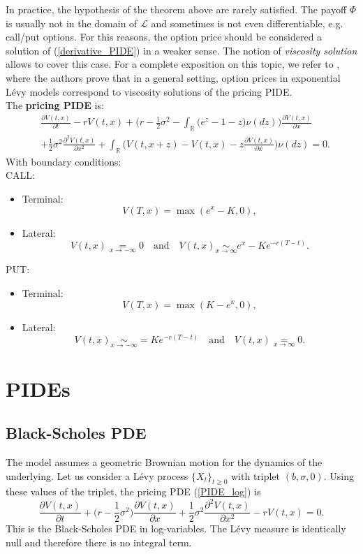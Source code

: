 \documentclass[a4paper,10pt]{article}
\newcommand{\numberset}{\mathbb}
\newcommand{\R}{\numberset{R}}
\newcommand{\LL}{\mathcal{L}}
\begin{document}
In practice, the hypothesis of the theorem above are rarely satisfied. 
The payoff $\Phi$ is usually not in the domain of $\LL$ and sometimes is not even differentiable, e.g. call/put options.   
For this reasons, the option price should be considered a solution of (\ref{derivative_PIDE}) in a weaker sense. 
The notion of \emph{viscosity solution} allows to cover this case.
For a complete exposition on this topic, we refer to \cite{CoVo05}, where the authors prove that in a general setting,
option prices in exponential Lévy models correspond to viscosity solutions of the pricing PIDE.\\

\noindent
The \textbf{pricing PIDE} is: 
\begin{align}\label{PIDE_log}
&  \frac{\partial V(t,x)}{\partial t} - r V(t,x) 
          + \biggl( r -\frac{1}{2}\sigma^2 - \int_{\R} \bigl( e^z-1-z \bigr) \nu(dz) \biggr) \frac{\partial V(t,x)}{\partial x} \\ \nonumber
          &+ \frac{1}{2} \sigma^2 \frac{\partial^2 V(t,x)}{\partial x^2} 
          + \int_{\R} \bigl( V(t,x+z)- V(t,x) - z \frac{\partial V(t,x)}{\partial x} \bigr) \nu(dz)  = 0.
\end{align}
With boundary conditions:\\
CALL:
\begin{itemize}
 \item Terminal:
 $$ V(T,x) = \max(e^x-K,0), $$
 \item Lateral:
 $$ V(t, x) \underset{x \to -\infty}{=} 0 \quad \mbox{and} \quad V(t, x) \underset{x \to \infty}{\sim} e^x - Ke^{-r(T-t)}. $$
\end{itemize}
PUT:
\begin{itemize}
 \item Terminal:
 $$ V(T,x) = \max(K-e^x,0), $$
 \item Lateral:
 $$ V(t, x) \underset{x \to -\infty}{\sim} = Ke^{-r(T-t)} \quad \mbox{and} \quad V(t, x) \underset{x \to \infty}{=} 0. $$
\end{itemize}


\section{PIDEs}

\subsection{Black-Scholes PDE}
The \cite{BS73} model assumes a geometric Brownian motion for the dynamics of the underlying.
Let us consider a Lévy process $\{X_t\}_{t\geq 0}$ with triplet $(b,\sigma,0)$.
Using these values of the triplet, the pricing PDE (\ref{PIDE_log}) is
\begin{equation}\label{BS_PDE}
\frac{\partial  V(t,x)}{\partial t}  
          + \biggl( r -\frac{1}{2}\sigma^2 \biggr) \frac{\partial V(t,x)}{\partial x}
          + \frac{1}{2} \sigma^2 \frac{\partial^2  V(t,x)}{\partial x^2} - r  V(t,x)  = 0.
\end{equation}
This is the Black-Scholes PDE in log-variables.
The Lévy measure is identically null and therefore there is no integral term.
\end{document}
